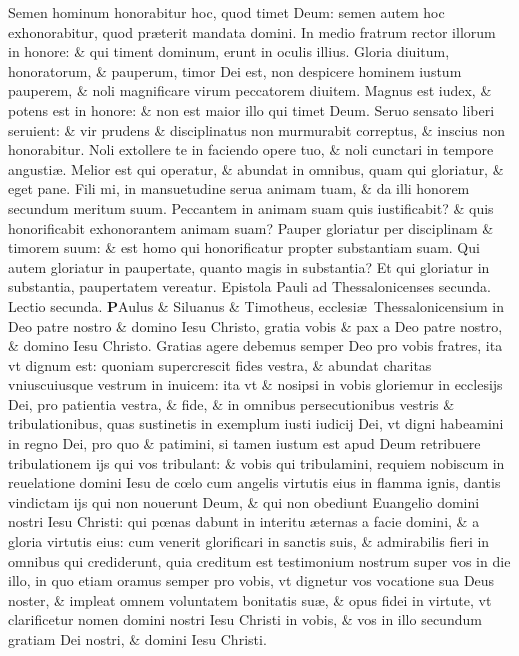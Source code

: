 \documentclass[a5paper,10pt]{book}
\def\leftmarginnote{%
	\lrmarginnote{\hskip -\marginparsep \hskip -6.5em}}
\def\ae{æ}
\def\oe{œ}
\begin{document}
\begin{multicols*}{2}
Semen hominum honorabitur hoc, quod timet Deum: semen autem hoc exhonorabitur, quod pr\ae terit mandata domini. In medio fratrum rector illorum in honore: \& qui timent dominum, erunt in oculis illius.
Gloria diuitum, honoratorum, \& pauperum, timor Dei est, non despicere hominem iustum pauperem, \& noli magnificare virum peccatorem diuitem.
Magnus est iudex, \& potens est in honore: \& non est maior illo qui timet Deum. Seruo sensato liberi seruient: \& vir prudens \& disciplinatus non murmurabit correptus, \& inscius non honorabitur.
Noli extollere te in faciendo opere tuo, \& noli cunctari in tempore angusti\ae . Melior est qui operatur, \& abundat in omnibus, quam qui gloriatur, \& eget pane.
Fili mi, in mansuetudine serua animam tuam, \& da illi honorem secundum meritum suum. Peccantem in animam suam quis iustificabit? \& quis honorificabit exhonorantem animam suam?
Pauper gloriatur per disciplinam \& timorem suum: \& est homo qui honorificatur propter substantiam suam. Qui autem gloriatur in paupertate, quanto magis in substantia? Et qui gloriatur in substantia, paupertatem vereatur.
\fancyhead[C]{\color{red} Feria. v. Dominic\ae . iij. Vagantium}
\newline {} \color{red} Epistola Pauli ad Thessalonicenses secunda. \quad Lectio secunda. \color{black}
\vspace{-.25em}
\lettrine[lines=2]{\bfseries \color{red} P}{}Aulus\leftmarginnote{\begin{flushright}ca. 1.\end{flushright}} \& Siluanus \& Timotheus, ecclesi\ae \ Thessalonicensium in Deo patre nostro \& domino Iesu Christo, gratia vobis \& pax a Deo patre nostro, \& domino Iesu Christo.
\newline \indent Gratias agere debemus semper Deo pro vobis fratres, ita vt dignum est: quoniam supercrescit fides vestra, \& abundat charitas vniuscuiusque vestrum in inuicem: ita vt \& nosipsi in vobis gloriemur in ecclesijs Dei, pro patientia vestra, \& fide, \& in omnibus persecutionibus vestris \& tribulationibus, quas sustinetis in exemplum iusti iudicij Dei, vt digni habeamini in regno Dei, pro quo \& patimini, si tamen iustum est apud Deum retribuere tribulationem ijs qui vos tribulant: \& vobis qui tribulamini, requiem nobiscum in reuelatione domini Iesu de c\oe lo cum angelis virtutis eius in flamma ignis, dantis vindictam ijs qui non nouerunt Deum, \& qui non obediunt Euangelio domini nostri Iesu Christi: qui p\oe nas dabunt in interitu \ae ternas a facie domini, \& a gloria virtutis eius: cum venerit glorificari in sanctis suis, \& admirabilis fieri in omnibus qui crediderunt, quia creditum est testimonium nostrum super vos in die illo, in quo etiam oramus semper pro vobis, vt dignetur vos vocatione sua Deus noster, \& impleat omnem voluntatem bonitatis su\ae , \& opus fidei in virtute, vt clarificetur nomen domini nostri Iesu Christi in vobis, \& vos in illo secundum gratiam Dei nostri, \& domini Iesu Christi.

\end{multicols*}
\end{document}
